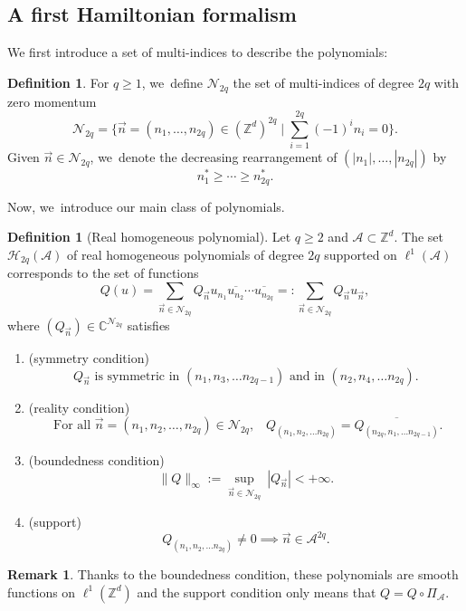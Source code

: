 \documentclass[JEP,XML,SOM,Unicode,published]{cedram}
\let\ts\textstyle
\theoremstyle{plain}
\theoremstyle{definition}
\newtheorem{definition}[theorem]{Definition}
\newtheorem{remark}[theorem]{Remark}
\newcommand{\Z}{\mathbb{Z}}
\newcommand{\C}{\mathbb{C}}
\newcommand{\1}{\mathbf{1}}
\begin{document}
\subsection{A first Hamiltonian formalism} We first introduce a set of multi-indices to describe the polynomials:
\begin{definition}
\label{def:multi}
For $q\geq1$, we~define $\mathcal{N}_{2q}$ the set of multi-indices of degree $2q$ with zero momentum
\[
\ts
\mathcal{N}_{2q} = \big\{ \vec{n} = (n_{1},\dots,n_{2q})\in (\Z^d)^{2q}\mid \sum_{i=1}^{2q}(-1)^{i}n_{i}=0\big\}.
\]
Given $\vec{n}\in\mathcal{N}_{2q}$, we~denote the decreasing rearrangement of $(|n_{1}|,\dots,|n_{2q}|)$ by
\[
n_{1}^{\ast}\geq \cdots \geq n_{2q}^{\ast}.
\]
\end{definition}
Now, we~introduce our main class of polynomials.
\begin{definition}[Real homogeneous polynomial]
\label{def:hamb} Let $q\geq 2$ and $\mathcal{A} \subset \mathbb{Z}^d$. The set $\mathcal{H}_{2q}(\mathcal{A})$ of real homogeneous polynomials of degree $2q$ supported on $ \ell^1(\mathcal{A})$ corresponds to the set of functions
\[
Q(u) = \sum_{\vec{n}\in\mathcal{N}_{2q}} Q_{\vec{n}}u_{n_{1}}\overline{u_{n_{2}}}\cdots \overline{u_{n_{2q}}}=:\sum_{\vec{n}\in\mathcal{N}_{2q}}Q_{\vec{n}}u_{\vec{n}},
\]
where $(Q_{\vec{n}})\in\C^{\mathcal{N}_{2q}}$ satisfies
\begin{enumerate}
\item
(symmetry condition)
\[
\text{$Q_{\vec{n}}$ is symmetric in $(n_{1},n_{3},\dots n_{2q-1})$ and in $(n_{2},n_{4},\dots n_{2q})$.}
\]

\item
(reality condition)
\[
\text{ For all $\vec{n}=(n_{1},n_{2},\dots,n_{2q})\in\mathcal{N}_{2q}$,}\quad Q_{(n_{1},n_{2},\dots n_{2q})} = \overline{Q_{(n_{2q},n_{1},\dots n_{2q-1})}}.
\]

\item
(boundedness condition)
\[
\|Q\|_{\infty} := \underset{\vec{n}\in\mathcal{N}_{2q}}{\sup}\ |Q_{\vec{n}}| <+\infty.
\]

\item
(support)
\[
Q_{(n_{1},n_{2},\dots n_{2q})} \neq 0 \implies \vec{n} \in \mathcal{A}^{2q}.
\]
\end{enumerate}
\end{definition}
\begin{remark}
Thanks to the boundedness condition, these polynomials are smooth functions on $\ell^1(\mathbb{Z}^d)$ and the support condition only means that $Q = Q\circ \Pi_{\mathcal{A}}$.
\end{remark}
\end{document}

